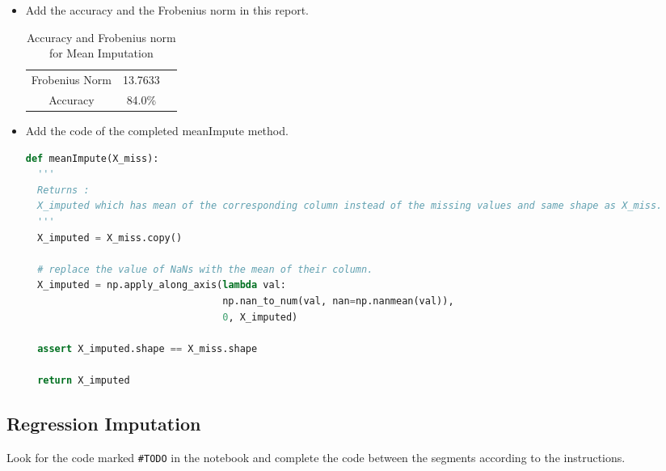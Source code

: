 \begin{itemize}
    \item 
Add the accuracy and the Frobenius norm in this report.

\begin{table}[H]
\centering
\begin{tabular}{ |c|c|c| } 
 \hline
 Frobenius Norm & 13.7633 \\
 Accuracy & 84.0\% \\
 \hline
\end{tabular}
\caption{Accuracy and Frobenius norm for Mean Imputation}
\label{nnOA}
\end{table}


\item
Add the code of the completed meanImpute method. 
\begin{lstlisting}[language = Python, caption=meanImpute method]
def meanImpute(X_miss):
  '''
  Returns :
  X_imputed which has mean of the corresponding column instead of the missing values and same shape as X_miss.
  '''
  X_imputed = X_miss.copy()

  # replace the value of NaNs with the mean of their column.
  X_imputed = np.apply_along_axis(lambda val: 
                                  np.nan_to_num(val, nan=np.nanmean(val)),
                                  0, X_imputed) 

  assert X_imputed.shape == X_miss.shape

  return X_imputed
\end{lstlisting}

\end{itemize}

\subsection{Regression Imputation}
Look for the code marked \verb|#TODO| in the notebook and complete the code between the segments according to the instructions. \\

